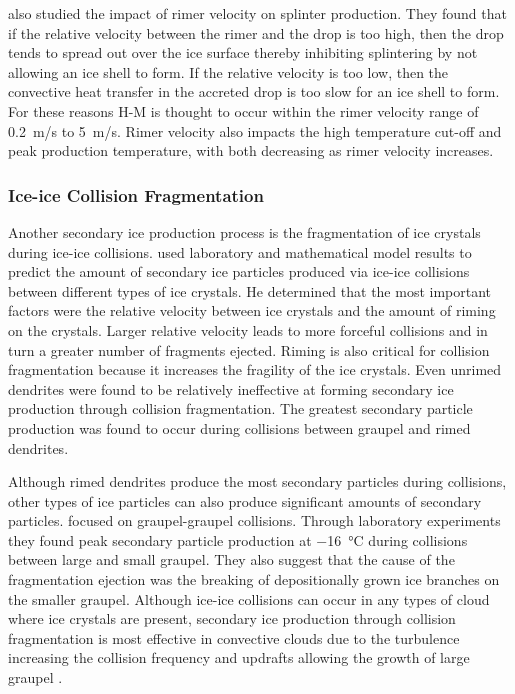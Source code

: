 \cite{moss1985} also studied the impact of rimer velocity on splinter production. They found that if the relative velocity between the rimer and the drop is too high, then the drop tends to spread out over the ice surface thereby inhibiting splintering by not allowing an ice shell to form. If the relative velocity is too low, then the convective heat transfer in the accreted drop is too slow for an ice shell to form. For these reasons H-M is thought to occur within the rimer velocity range of \SI{0.2}{m/s} to \SI{5}{m/s}. Rimer velocity also impacts the high temperature cut-off and peak production temperature, with both decreasing as rimer velocity increases.

\subsubsection{Ice-ice Collision Fragmentation}
Another secondary ice production process is the fragmentation of ice crystals during ice-ice collisions. \cite{vard1978} used laboratory and mathematical model results to predict the amount of secondary ice particles produced via ice-ice collisions between different types of ice crystals. He determined that the most important factors were the relative velocity between ice crystals and the amount of riming on the crystals. Larger relative velocity leads to more forceful collisions and in turn a greater number of fragments ejected. Riming is also critical for collision fragmentation because it increases the fragility of the ice crystals. Even unrimed dendrites were found to be relatively ineffective at forming secondary ice production through collision fragmentation. The greatest secondary particle production was found to occur during collisions between graupel and rimed dendrites. 

Although rimed dendrites produce the most secondary particles during collisions, other types of ice particles can also produce significant amounts of secondary particles. \cite{taka1995} focused on graupel-graupel collisions. Through laboratory experiments they found peak secondary particle production at \SI{-16}{\degreeCelsius} during collisions between large and small graupel. They also suggest that the cause of the fragmentation ejection was the breaking of depositionally grown ice branches on the smaller graupel. Although ice-ice collisions can occur in any types of cloud where ice crystals are present, secondary ice production through collision fragmentation is most effective in convective clouds due to the turbulence increasing the collision frequency and updrafts allowing the growth of large graupel \citep{vard1978}.

